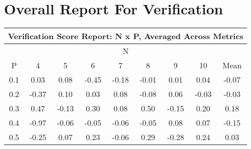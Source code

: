 \documentclass[11pt,a4paper]{report}
\begin{document}
\chapter{Overall Report For Verification}
\begin{longtable}{ | c || c | c | c | c | c | c | c || c |}
\hline
\multicolumn{9}{|c|}{ Verification Score Report: N x P, Averaged Across Metrics } \\
\hline
\multicolumn{9}{|c|}{ N } \\
\hline
P & 4 & 5 & 6 & 7 & 8 & 9 & 10 & Mean\\
\hline
\hline
\endhead
0.1 &  \cellcolor[HTML]{FFFFFF} 0.03 &  \cellcolor[HTML]{FFFFFF} 0.08 &  \cellcolor[HTML]{FFF7F7} -0.45 &  \cellcolor[HTML]{FFF7F7} -0.18 &  \cellcolor[HTML]{FFFFFF} -0.01 &  \cellcolor[HTML]{FFFFFF} 0.01 &  \cellcolor[HTML]{FFFFFF} 0.04 &  \cellcolor[HTML]{FFFFFF} -0.07 \\
0.2 &  \cellcolor[HTML]{FFF7F7} -0.37 &  \cellcolor[HTML]{FFFFFF} 0.10 &  \cellcolor[HTML]{FFFFFF} 0.03 &  \cellcolor[HTML]{FFFFFF} 0.08 &  \cellcolor[HTML]{FFFFFF} -0.08 &  \cellcolor[HTML]{FFFFFF} 0.06 &  \cellcolor[HTML]{FFFFFF} -0.03 &  \cellcolor[HTML]{FFFFFF} -0.03 \\
0.3 &  \cellcolor[HTML]{F7F7FF} 0.47 &  \cellcolor[HTML]{FFFFFF} -0.13 &  \cellcolor[HTML]{F7F7FF} 0.30 &  \cellcolor[HTML]{FFFFFF} 0.08 &  \cellcolor[HTML]{EFEFFF} 0.50 &  \cellcolor[HTML]{FFFFFF} -0.15 &  \cellcolor[HTML]{F7F7FF} 0.20 &  \cellcolor[HTML]{F7F7FF} 0.18 \\
0.4 &  \cellcolor[HTML]{FFE7E7} -0.97 &  \cellcolor[HTML]{FFFFFF} -0.06 &  \cellcolor[HTML]{FFFFFF} -0.05 &  \cellcolor[HTML]{FFFFFF} -0.06 &  \cellcolor[HTML]{FFFFFF} -0.05 &  \cellcolor[HTML]{FFFFFF} 0.08 &  \cellcolor[HTML]{FFFFFF} 0.07 &  \cellcolor[HTML]{FFFFFF} -0.15 \\
0.5 &  \cellcolor[HTML]{FFF7F7} -0.25 &  \cellcolor[HTML]{FFFFFF} 0.07 &  \cellcolor[HTML]{F7F7FF} 0.23 &  \cellcolor[HTML]{FFFFFF} -0.06 &  \cellcolor[HTML]{F7F7FF} 0.29 &  \cellcolor[HTML]{FFF7F7} -0.28 &  \cellcolor[HTML]{F7F7FF} 0.24 &  \cellcolor[HTML]{FFFFFF} 0.03 \\

\end{longtable}
\end{document}

